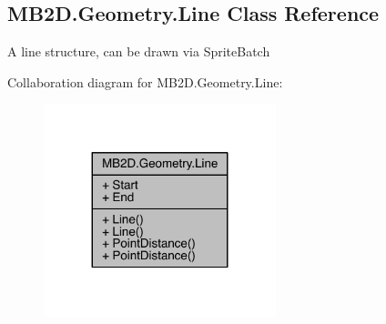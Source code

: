 \hypertarget{class_m_b2_d_1_1_geometry_1_1_line}{}\subsection{M\+B2\+D.\+Geometry.\+Line Class Reference}
\label{class_m_b2_d_1_1_geometry_1_1_line}


A line structure, can be drawn via Sprite\+Batch  




Collaboration diagram for M\+B2\+D.\+Geometry.\+Line\+:
\nopagebreak
\begin{figure}[H]
\begin{center}
\leavevmode
\includegraphics[width=191pt]{class_m_b2_d_1_1_geometry_1_1_line__coll__graph}
\end{center}
\end{figure}
